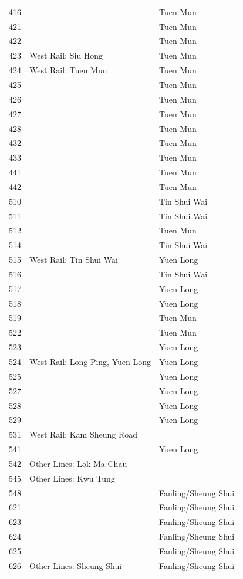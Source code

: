 \begin{longtable}{p{1.5cm}p{8cm}p{4cm}}
416 &  & Tuen Mun \\
421 &  & Tuen Mun \\
422 &  & Tuen Mun \\
423 & West Rail: Siu Hong & Tuen Mun \\
424 & West Rail: Tuen Mun & Tuen Mun \\
425 &  & Tuen Mun \\
426 &  & Tuen Mun \\
427 &  & Tuen Mun \\
428 &  & Tuen Mun \\
432 &  & Tuen Mun \\
433 &  & Tuen Mun \\
441 &  & Tuen Mun \\
442 &  & Tuen Mun \\
510 &  & Tin Shui Wai \\
511 &  & Tin Shui Wai \\
512 &  & Tuen Mun \\
514 &  & Tin Shui Wai \\
515 & West Rail: Tin Shui Wai & Yuen Long \\
516 &  & Tin Shui Wai \\
517 &  & Yuen Long \\
518 &  & Yuen Long \\
519 &  & Tuen Mun \\
522 &  & Tuen Mun \\
523 &  & Yuen Long \\
524 & West Rail: Long Ping, Yuen Long & Yuen Long \\
525 &  & Yuen Long \\
527 &  & Yuen Long \\
528 &  & Yuen Long \\
529 &  & Yuen Long \\
531 & West Rail: Kam Sheung Road &  \\
541 &  & Yuen Long \\
542 & Other Lines: Lok Ma Chau &  \\
545 & Other Lines: Kwu Tung &  \\
548 &  & Fanling/Sheung Shui \\
621 &  & Fanling/Sheung Shui \\
623 &  & Fanling/Sheung Shui \\
624 &  & Fanling/Sheung Shui \\
625 &  & Fanling/Sheung Shui \\
626 & Other Lines: Sheung Shui & Fanling/Sheung Shui \\

\end{longtable}
